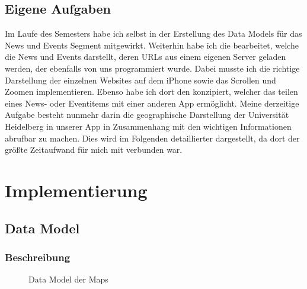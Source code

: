 \documentclass{report}
\begin{document}
\section{Eigene Aufgaben}

Im Laufe des Semesters habe ich selbst in der Erstellung des Data Models für das News und Events Segment mitgewirkt. Weiterhin habe ich die  bearbeitet, welche die News und Events darstellt, deren URLs aus einem eigenen Server geladen werden, der ebenfalls von uns programmiert wurde. Dabei musste ich die richtige Darstellung der einzelnen Websites auf dem iPhone sowie das Scrollen und Zoomen implementieren. Ebenso habe ich dort den  konzipiert, welcher das teilen eines News- oder Eventitems mit einer anderen App ermöglicht. Meine derzeitige Aufgabe besteht nunmehr darin die geographische Darstellung der Universität Heidelberg in unserer App in Zusammenhang mit den wichtigen Informationen abrufbar zu machen. Dies wird im Folgenden detaillierter dargestellt, da dort der größte Zeitaufwand für mich mit verbunden war.

\newpage

\chapter{Implementierung}

\section{Data Model}

\subsection{Beschreibung}

\begin{figure}[ht]
\centering {}
\caption{Data Model der Maps}\label{bild_1}
\end{figure}
\end{document}

